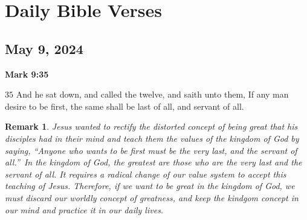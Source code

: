 \documentclass{article}
\newtheorem{remark}[theorem]{Remark}
\begin{document}
\tableofcontents

\section{Daily Bible Verses}

\subsection{\protect\bigskip May 9, 2024}

\textbf{Mark 9:35}

$35$ And he sat down, and called the twelve, and saith unto them, If any man
desire to be first, the same shall be last of all, and servant of all. 

\begin{remark}
Jesus wanted to rectify the distorted concept of being great that his
disciples had in their mind and teach them the values of the kingdom of God
by saying, \textquotedblleft Anyone who wants to be first must be the very
last, and the servant of all.\textquotedblright\ In the kingdom of God, the
greatest are those who are the very last and the servant of all. It requires
a radical change of our value system to accept this teaching of Jesus.
Therefore, if we want to be great in the kingdom of God, we must discard our
worldly concept of greatness, and keep the kindgom concept in our mind and
practice it in our daily lives.
\end{remark}
\end{document}
